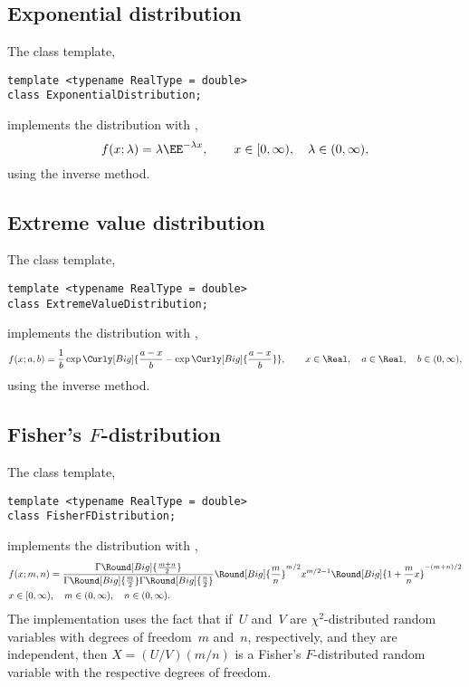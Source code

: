\subsection{Exponential distribution}
\label{sub:Exponential distribution}

The class template,
\begin{verbatim}
template <typename RealType = double>
class ExponentialDistribution;
\end{verbatim}
implements the distribution with \pdf,
\begin{equation*}
  f(x;\lambda) = \lambda\EE^{-\lambda x},\qquad
  x \in [0,\infty),\quad \lambda \in (0,\infty),
\end{equation*}
using the inverse method.

\subsection{Extreme value distribution}
\label{sub:Extreme value distribution}

The class template,
\begin{verbatim}
template <typename RealType = double>
class ExtremeValueDistribution;
\end{verbatim}
implements the distribution with \pdf,
\begin{equation*}
  f(x;a,b) =
  \frac{1}{b}\exp\Curly[Big]{
    \frac{a - x}{b} - \exp\Curly[Big]{\frac{a - x}{b}}},\qquad
  x \in \Real,\quad a \in \Real,\quad b \in (0, \infty),
\end{equation*}
using the inverse method.

\subsection{Fisher's \texorpdfstring{$F$}{F}-distribution}
\label{sub:Fisher's F-distribution}

The class template,
\begin{verbatim}
template <typename RealType = double>
class FisherFDistribution;
\end{verbatim}
implements the distribution with \pdf,
\begin{align*}
  & f(x;m,n) =
  \frac{\Gamma\Round[Big]{\frac{m + n}{2}}}{
    \Gamma\Round[Big]{\frac{m}{2}}\Gamma\Round[Big]{\frac{n}{2}}}
  \Round[Big]{\frac{m}{n}}^{m/2} x^{m / 2 - 1}
  \Round[Big]{1 + \frac{m}{n}x}^{-(m + n) / 2} \\
  & x \in [0, \infty),\quad m \in (0, \infty),\quad n \in (0, \infty).
\end{align*}
The implementation uses the fact that if~$U$ and~$V$ are $\chi^2$-distributed
random variables with degrees of freedom~$m$ and~$n$, respectively, and they
are independent, then $X = (U / V)(m / n)$ is a Fisher's $F$-distributed random
variable with the respective degrees of freedom.


